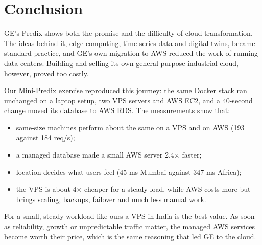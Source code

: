 \documentclass[12pt,a4paper]{article}
\begin{document}
\section{Conclusion}
GE's Predix shows both the promise and the difficulty of cloud transformation. The ideas behind it,
edge computing, time-series data and digital twins, became standard practice, and GE's own migration
to AWS reduced the work of running data centers. Building and selling its own general-purpose
industrial cloud, however, proved too costly.

Our Mini-Predix exercise reproduced this journey: the same Docker stack ran unchanged on a laptop setup,
two VPS servers and AWS EC2, and a 40-second change moved its database to AWS RDS. The measurements
show that:
\begin{itemize}
  \item same-size machines perform about the same on a VPS and on AWS (193 against 184 req/s);
  \item a managed database made a small AWS server 2.4$\times$ faster;
  \item location decides what users feel (45 ms Mumbai against 347 ms Africa);
  \item the VPS is about 4$\times$ cheaper for a steady load, while AWS costs more but brings scaling,
        backups, failover and much less manual work.
\end{itemize}
For a small, steady workload like ours a VPS in India is the best value. As soon as reliability,
growth or unpredictable traffic matter, the managed AWS services become worth their price, which is
the same reasoning that led GE to the cloud.

\end{document}
